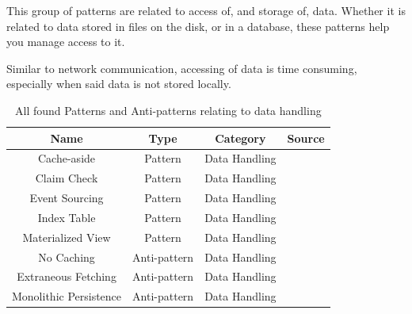 \documentclass[a4paper,UKenglish]{dagrep}
\begin{document}
This group of patterns are related to access of, and storage of, data. Whether it is related to data stored in files on the disk, or in a database, these patterns help you manage access to it.

Similar to network communication, accessing of data is time consuming, especially when said data is not stored  locally.

\begin{table}[H]
	\begin{tabular}{c|ccc}
		Name                       & Type    & Category           & Source                                    \\\hline
		Cache-aside                & Pattern & Data Handling      & \cite{microsoft2024performanceefficiency} \\
		Claim Check                & Pattern & Data Handling      & \cite{microsoft2024performanceefficiency} \\
		Event Sourcing             & Pattern & Data Handling      & \cite{microsoft2024performanceefficiency} \\
		Index Table                & Pattern & Data Handling      & \cite{microsoft2024performanceefficiency} \\
		Materialized View          & Pattern & Data Handling      & \cite{microsoft2024performanceefficiency} \\
		No Caching                        & Anti-pattern & Data Handling      & \cite{MicrosoftAntipatterns}                            \\
		Extraneous Fetching               & Anti-pattern & Data Handling      & \cite{MicrosoftAntipatterns}                            \\
		Monolithic Persistence            & Anti-pattern & Data Handling      & \cite{MicrosoftAntipatterns}                            \\
	\end{tabular}
	\caption{All found Patterns and Anti-patterns relating to data handling}
	\label{tab:patterns}
\end{table}
\end{document}
